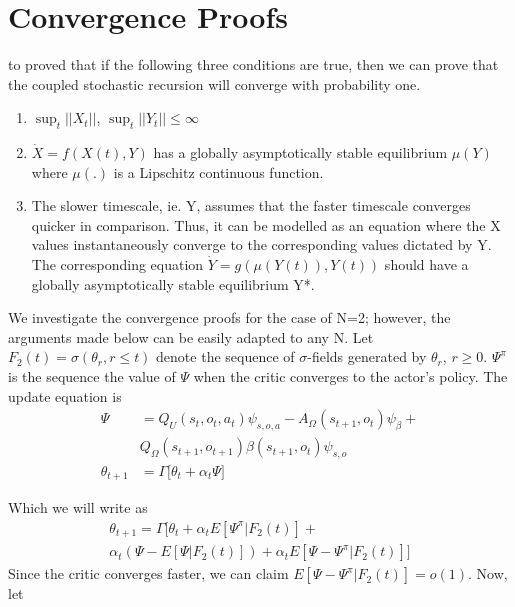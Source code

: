 \documentclass[letterpaper]{article} %
\begin{document}
\section{Convergence Proofs}
\cite{bhatnagar2009natural} to proved that if the following three conditions are true, then we can prove that the coupled stochastic recursion will converge with probability one.


\begin{enumerate}
  \item $\sup_{t} ||X_{t}||$, $\sup_{t} ||Y_{t}|| \leq \infty$
  \item  $\Dot{X}=f(X(t),Y)$ has a globally asymptotically stable equilibrium $\mu(Y)$ where $\mu(.)$ is a Lipschitz continuous function.
  \item The slower timescale, ie. Y, assumes that the faster timescale converges quicker in comparison. Thus, it can be modelled as an equation where the X values instantaneously converge to the corresponding values dictated by Y. The corresponding equation $\Dot{Y}=g(\mu(Y(t)),Y(t))$ should have a globally asymptotically stable equilibrium Y*.
\end{enumerate}

We investigate the convergence proofs for the case of N=2; however, the arguments made below can be easily adapted to any N. Let $F_{2}(t) = \sigma(\theta_{r}, r \leq t)$ denote the sequence of $\sigma$-fields generated by $\theta_{r}$, $ r \geq 0$. $\Psi^{\pi}$ is the sequence the value of $\Psi$ when the critic converges to the actor's policy. The update equation is
\begin{equation} 
\begin{split}
  \Psi &= Q_U(s_{t},o_{t},a_{t}) \psi_{s,o,a} -
 A_\Omega(s_{t+1},o_{t}) \psi_{\beta} +\\
 &Q_\Omega(s_{t+1},o_{t+1}) \beta(s_{t+1},o_{t}) \psi_{s,o}  \\
\theta_{t+1} &= \Gamma \bigg[\theta_{t} + \alpha_{t} \Psi
 \bigg]
\end{split}
\end{equation}

Which we will write as 
\begin{equation} 
\begin{split}
\theta_{t+1} = \Gamma \bigg[\theta_{t} + \alpha_{t} E[\Psi^{\pi}| F_{2}(t)] +\\
\alpha_{t} (\Psi - E[\Psi| F_{2}(t)]) + \alpha_{t}E[\Psi-\Psi^{\pi}| F_{2}(t)]
 \bigg]
\end{split}
\end{equation}
Since the critic converges faster, we can claim $E[\Psi-\Psi^{\pi}| F_{2}(t)] = o(1)$. Now, let
\end{document}

